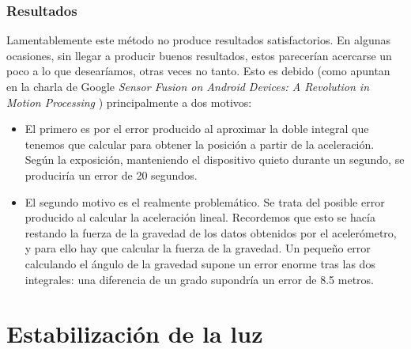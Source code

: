 \documentclass[a4paper,openright, 12pt]{book}
\begin{document}
\subsection{Resultados}
Lamentablemente este método no produce resultados satisfactorios. En algunas ocasiones, sin llegar a producir buenos resultados, estos parecerían acercarse un poco a lo que desearíamos, otras veces no tanto. Esto es debido  (como apuntan en la charla de Google \textit{Sensor Fusion on Android Devices: A Revolution in Motion Processing} \cite{googlesensor}) principalmente a dos motivos:
\begin{itemize}
\item El primero es por el error producido al aproximar la doble integral que tenemos que calcular para obtener la posición a partir de la aceleración. Según la exposición, manteniendo el dispositivo quieto durante un segundo, se produciría un error de 20 segundos.
\item El segundo motivo es el realmente problemático. Se trata del posible error producido al calcular la aceleración lineal. Recordemos que esto se hacía restando la fuerza de la gravedad de los datos obtenidos por el acelerómetro, y para ello hay que calcular la fuerza de la gravedad. Un pequeño error calculando el ángulo de la gravedad supone un error enorme tras las dos integrales: una diferencia de un grado supondría un error de 8.5 metros.
\end{itemize}

\chapter{Estabilización de la luz}
\end{document}
